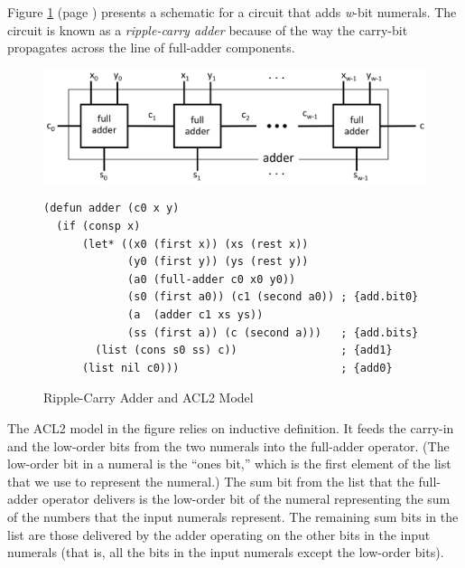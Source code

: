 Figure \ref{fig:adder} (page \pageref{fig:adder}) presents a schematic
for a circuit that adds \emph{w}-bit numerals.
The circuit is known as a \emph{ripple-carry adder} because
of the way the carry-bit propagates across the line
of full-adder components.

\begin{figure}
\begin{center}
\includegraphics[scale=0.25]{Images/adder.png}
\begin{Verbatim}
(defun adder (c0 x y)
  (if (consp x)
      (let* ((x0 (first x)) (xs (rest x))
             (y0 (first y)) (ys (rest y))
             (a0 (full-adder c0 x0 y0))
             (s0 (first a0)) (c1 (second a0)) ; {add.bit0}
             (a  (adder c1 xs ys))
             (ss (first a)) (c (second a)))   ; {add.bits}
        (list (cons s0 ss) c))                ; {add1}
      (list nil c0)))                         ; {add0}
\end{Verbatim}
\end{center}
\caption{Ripple-Carry Adder and ACL2 Model}
\label{fig:adder}
\end{figure}

The ACL2 model in the figure relies
on inductive definition. It feeds the carry-in and
the low-order bits from the two numerals into the \textsf{full-adder} operator.
(The low-order bit in a numeral is the ``ones bit,''
which is the first element of the list that we use to
represent the numeral.)
The sum bit from the list that the \textsf{full-adder} operator delivers
is the low-order bit of the numeral representing the sum of
the numbers that the input numerals represent.
The remaining sum bits in the list are those delivered by
the \textsf{adder} operating on the other bits in the input numerals
(that is, all the bits in the input numerals except the low-order bits).

